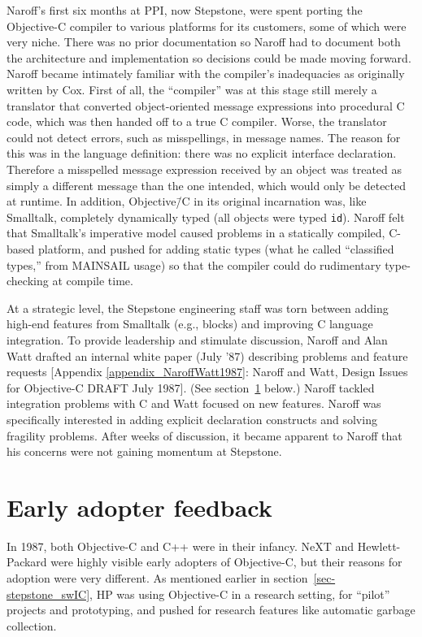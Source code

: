 \documentclass[acmsmall,screen]{acmart}
\begin{document}
Naroff's first six months at PPI, now Stepstone, were spent porting the Objective-C compiler to various platforms for its customers, some of which were very niche. There was no prior documentation so Naroff had to document both the architecture and implementation so decisions could be made moving forward. Naroff became intimately familiar with the compiler's inadequacies as originally written by Cox. First of all, the ``compiler'' was at this stage still merely a translator that converted object-oriented message expressions into procedural C code, which was then handed off to a true C compiler. Worse, the translator could not detect errors, such as misspellings, in message names. The reason for this was in the language definition: there was no explicit interface declaration. Therefore a misspelled message expression received by an object was treated as simply a different message than the one intended, which would only be detected at runtime. In addition, Objective\=/C in its original incarnation was, like Smalltalk, completely dynamically typed (all objects were typed \verb$id$). Naroff felt that Smalltalk's imperative model caused problems in a statically compiled, C-based platform, and pushed for adding static types (what he called ``classified types,'' from MAINSAIL usage) so that the compiler could do rudimentary type-checking at compile time.

At a strategic level, the Stepstone engineering staff was torn between adding high-end features from Smalltalk (e.g., blocks) and improving C language integration. To provide leadership and stimulate discussion, Naroff and Alan Watt drafted an internal white paper (July '87) describing problems and feature requests [Appendix \ref{appendix_NaroffWatt1987}: Naroff and Watt, Design Issues for Objective-C DRAFT July 1987]. (See section~\ref{sec-earlyadopterfeedback} below.) Naroff tackled integration problems with C and Watt focused on new features. Naroff was specifically interested in adding explicit declaration constructs and solving fragility problems. After weeks of discussion, it became apparent to Naroff that his concerns were not gaining momentum at Stepstone. 
\section{Early adopter feedback}
\label{sec-earlyadopterfeedback}
In 1987, both Objective-C and C++ were in their infancy. NeXT and Hewlett-Packard were highly visible early adopters of Objective-C, but their reasons for adoption were very different. As mentioned earlier in section~\ref{sec-stepstone_swIC}, HP was using Objective-C in a research setting, for ``pilot'' projects and prototyping, and pushed for research features like automatic garbage collection.
\end{document}
